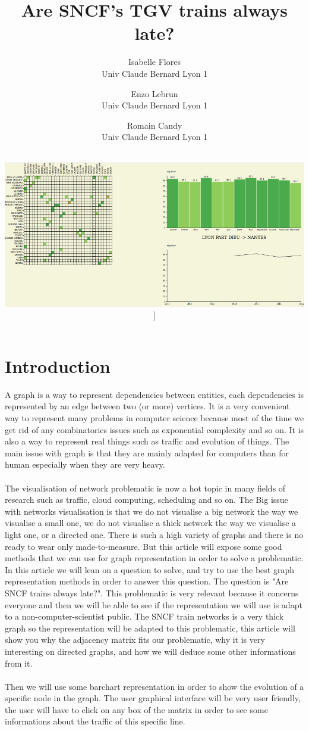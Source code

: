 \documentclass{vgtc}
\title{Are SNCF's TGV trains always late?
}
\author{Isabelle Flores \\ Univ Claude Bernard Lyon 1
\and Enzo Lebrun \\ Univ Claude Bernard Lyon 1
\and Romain Candy \\ Univ Claude Bernard Lyon 1
\and \\ \includegraphics[scale=.5]{intro}]
}
\begin{document}
\maketitle

\section{Introduction}
A graph is a way to represent dependencies between entities, each dependencies is represented by an edge between two (or more) vertices. It is a very convenient way to represent many problems in computer science because most of the time we get rid of any combinatorics issues such as exponential complexity and so on. It is also a way to represent real things such as traffic and evolution of things. The main issue with graph is that they are mainly adapted for computers than for human especially when they are very heavy.
\\
\\
\indent
The visualisation of network problematic is now a hot topic in many fields of research such as traffic, cloud computing, scheduling and so on. The Big issue with networks visualisation  is that we do not visualise a big network the way we visualise a small one, we do not visualise a thick network the way we visualise a light one, or a directed one. There is such a high variety of graphs and there is no ready to wear only made-to-measure. But this article will expose some good methods that we can use for graph representation in order to solve a problematic. In this article we will lean on a question to solve, and try to use the best graph representation methods in order to answer this question. The question is "Are SNCF trains always late?". This problematic is very relevant because it concerns everyone and then we will be able to see if the representation we will use is adapt to a non-computer-scientist public.
The SNCF train networks is a very thick graph so the representation will be adapted to this problematic, this article will show you why the adjacency matrix fits our problematic, why it is very interesting on directed graphs, and how we will deduce some other informations from it.
\\
\\
\indent
Then we will use some barchart representation in order to show the evolution of a specific node in the graph. The user graphical interface will be very user friendly, the user will have to click on any box of the matrix in order to see some informations about the traffic of this specific line.
\end{document}
